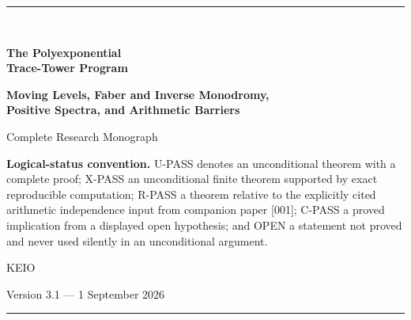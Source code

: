 \documentclass[11pt]{article}
\theoremstyle{keio}
\theoremstyle{definition}
\theoremstyle{remark}
\newcommand{\UPASS}{\textcolor{keiogreen}{\textsf{U-PASS}}}
\newcommand{\XPASS}{\textcolor{keioxblue}{\textsf{X-PASS}}}
\newcommand{\RPASS}{\textcolor{keioxblue}{\textsf{R-PASS}}}
\newcommand{\CPASS}{\textcolor{keioviolet}{\textsf{C-PASS}}}
\newcommand{\OPEN}{\textcolor{keioopen}{\textsf{OPEN}}}
\begin{document}
\hypersetup{pageanchor=false}
\begin{titlepage}
\thispagestyle{empty}
\vspace*{18mm}
{\color{keionavy}\rule{\textwidth}{1.2pt}}\\[11mm]
{\Huge\bfseries\color{keionavy}The Polyexponential\\[2mm]Trace-Tower Program\par}
\vspace{6mm}
{\LARGE\bfseries Moving Levels, Faber and Inverse Monodromy,\\
Positive Spectra, and Arithmetic Barriers\par}
\vspace{12mm}
{\large Complete Research Monograph\par}
\vfill
\begin{statusbox}
\textbf{Logical-status convention.}
\UPASS{} denotes an unconditional theorem with a complete proof;
\XPASS{} an unconditional finite theorem supported by exact reproducible
computation; \RPASS{} a theorem relative to the explicitly cited arithmetic
independence input from companion paper [001]; \CPASS{} a proved implication
from a displayed open hypothesis; and \OPEN{} a statement not proved and never
used silently in an unconditional argument.
\end{statusbox}
\vfill
{\Large KEIO\par}
\vspace{2mm}
{\large Version 3.1 --- 1 September 2026\par}
\vspace{7mm}
{\color{keionavy}\rule{\textwidth}{1.2pt}}
\end{titlepage}
\hypersetup{pageanchor=true}
\end{document}
